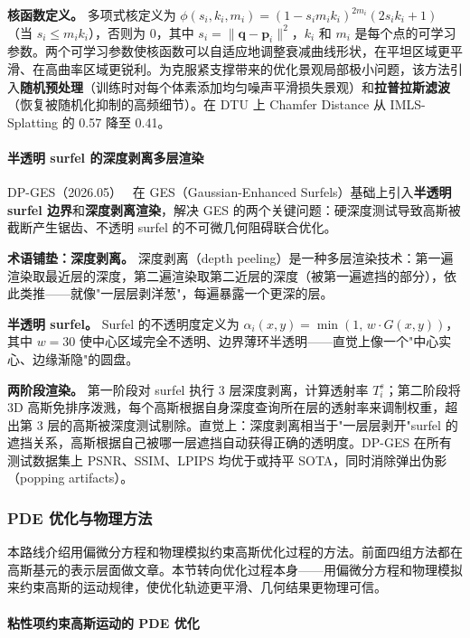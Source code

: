\textbf{核函数定义。} 多项式核定义为 $\phi(s_i, k_i, m_i) = (1 - s_i m_i k_i)^{2m_i}(2s_i k_i + 1)$（当 $s_i \leq m_i k_i$），否则为 0，其中 $s_i = \|\mathbf{q} - \mathbf{p}_i\|^2$，$k_i$ 和 $m_i$ 是每个点的可学习参数。两个可学习参数使核函数可以自适应地调整衰减曲线形状，在平坦区域更平滑、在高曲率区域更锐利。为克服紧支撑带来的优化景观局部极小问题，该方法引入\textbf{随机预处理}（训练时对每个体素添加均匀噪声平滑损失景观）和\textbf{拉普拉斯滤波}（恢复被随机化抑制的高频细节）。在 DTU 上 Chamfer Distance 从 IMLS-Splatting 的 0.57 降至 0.41。

\paragraph{半透明 surfel 的深度剥离多层渲染}

DP-GES（2026.05）~\cite{2605_25345} 在 GES（Gaussian-Enhanced Surfels）基础上引入\textbf{半透明 surfel 边界}和\textbf{深度剥离渲染}，解决 GES 的两个关键问题：硬深度测试导致高斯被截断产生锯齿、不透明 surfel 的不可微几何阻碍联合优化。

\textbf{术语铺垫：深度剥离。} 深度剥离（depth peeling）是一种多层渲染技术：第一遍渲染取最近层的深度，第二遍渲染取第二近层的深度（被第一遍遮挡的部分），依此类推——就像"一层层剥洋葱"，每遍暴露一个更深的层。

\textbf{半透明 surfel。} Surfel 的不透明度定义为 $\alpha_i(x,y) = \min(1,\, w \cdot G(x,y))$，其中 $w=30$ 使中心区域完全不透明、边界薄环半透明——直觉上像一个"中心实心、边缘渐隐"的圆盘。

\textbf{两阶段渲染。} 第一阶段对 surfel 执行 3 层深度剥离，计算透射率 $T_i^s$；第二阶段将 3D 高斯免排序泼溅，每个高斯根据自身深度查询所在层的透射率来调制权重，超出第 3 层的高斯被深度测试剔除。直觉上：深度剥离相当于"一层层剥开"surfel 的遮挡关系，高斯根据自己被哪一层遮挡自动获得正确的透明度。DP-GES 在所有测试数据集上 PSNR、SSIM、LPIPS 均优于或持平 SOTA，同时消除弹出伪影（popping artifacts）。

\subsubsection{PDE 优化与物理方法}

本路线介绍用偏微分方程和物理模拟约束高斯优化过程的方法。前面四组方法都在高斯基元的表示层面做文章。本节转向优化过程本身——用偏微分方程和物理模拟来约束高斯的运动规律，使优化轨迹更平滑、几何结果更物理可信。

\paragraph{粘性项约束高斯运动的 PDE 优化}

